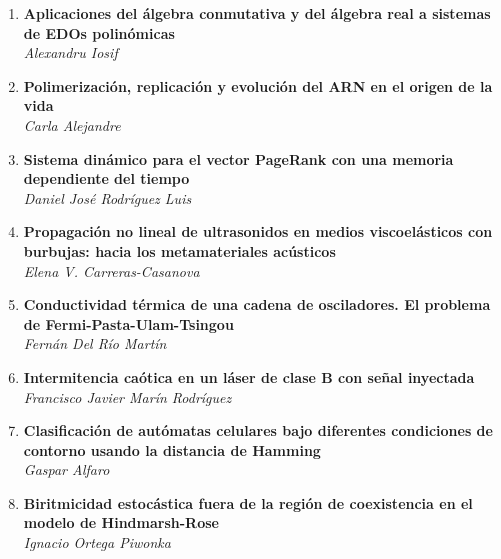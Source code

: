 \documentclass[11pt,a4paper]{article}
\begin{document}
\begin{center}
\begin{minipage}{0.9\textwidth}
\large
\begin{enumerate}
  \item \textbf{Aplicaciones del álgebra conmutativa y del álgebra real a sistemas de EDOs polinómicas} \\ \emph{Alexandru Iosif} \dotfill \ \hspace{0.1cm} \pageref{abs:1}

  \item \textbf{Polimerización, replicación y evolución del ARN en el origen de la vida} \\ \emph{Carla Alejandre} \dotfill \ \hspace{0.1cm} \pageref{abs:2}

  \item \textbf{Sistema dinámico para el vector PageRank con una memoria dependiente del tiempo} \\ \emph{Daniel José Rodríguez Luis} \dotfill \ \hspace{0.1cm} \pageref{abs:3}

  \item \textbf{Propagación no lineal de ultrasonidos en medios viscoelásticos con burbujas: hacia los metamateriales acústicos} \\ \emph{Elena V. Carreras-Casanova} \dotfill \ \hspace{0.1cm} \pageref{abs:4}

  \item \textbf{Conductividad térmica de una cadena de osciladores. El problema de Fermi-Pasta-Ulam-Tsingou} \\ \emph{Fernán Del Río Martín} \dotfill \ \hspace{0.1cm} \pageref{abs:5}

  \item \textbf{Intermitencia caótica en un láser de clase B con señal inyectada} \\ \emph{Francisco Javier Marín Rodríguez} \dotfill \ \hspace{0.1cm} \pageref{abs:6}

  \item \textbf{Clasificación de autómatas celulares bajo diferentes condiciones de contorno usando la distancia de Hamming} \\ \emph{Gaspar Alfaro} \dotfill \ \hspace{0.1cm} \pageref{abs:7}

  \item \textbf{Biritmicidad estocástica fuera de la región de coexistencia en el modelo de Hindmarsh-Rose} \\ \emph{Ignacio Ortega Piwonka} \dotfill \ \hspace{0.1cm} \pageref{abs:8}


\end{enumerate}
\end{minipage}
\end{center}
\end{document}
